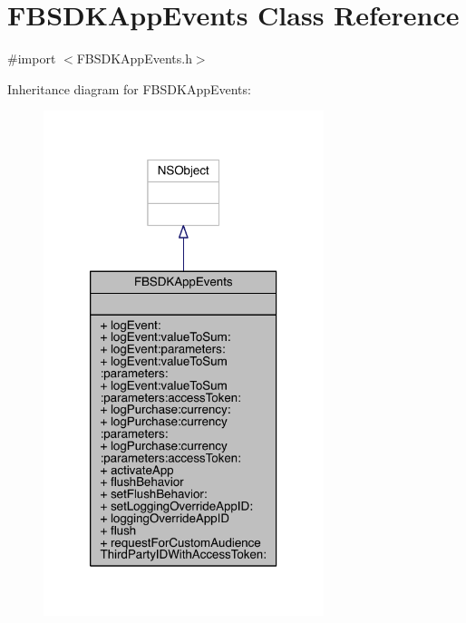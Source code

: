 \hypertarget{interface_f_b_s_d_k_app_events}{\section{F\-B\-S\-D\-K\-App\-Events Class Reference}
\label{interface_f_b_s_d_k_app_events}
}


{\ttfamily \#import $<$F\-B\-S\-D\-K\-App\-Events.\-h$>$}



Inheritance diagram for F\-B\-S\-D\-K\-App\-Events\-:
\nopagebreak
\begin{figure}[H]
\begin{center}
\leavevmode
\includegraphics[width=232pt]{interface_f_b_s_d_k_app_events__inherit__graph}
\end{center}
\end{figure}


